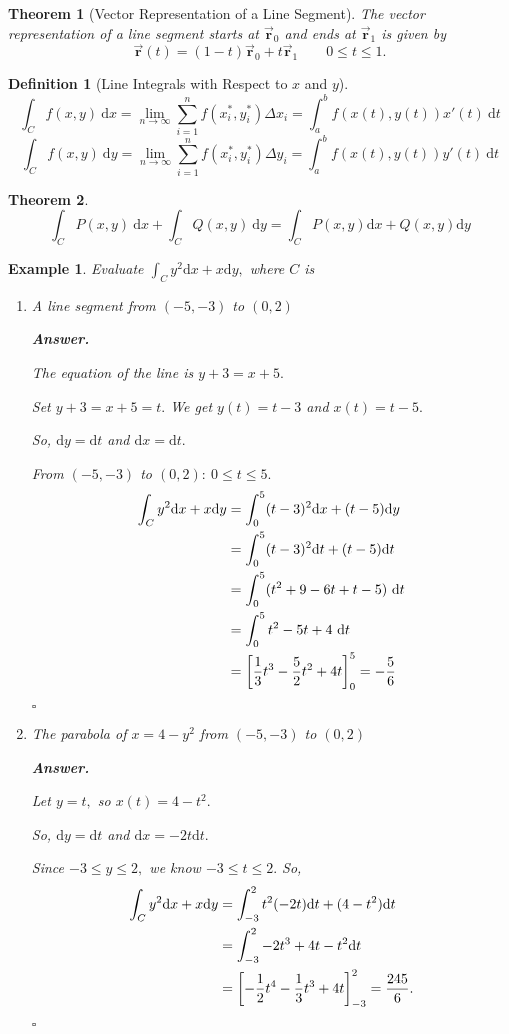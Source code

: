 \documentclass[12pt,a4paper]{article}
\newtheorem{thm}{Theorem}[subsection]
\newtheorem{df}{Definition}[subsection]
\newtheorem{eg}{Example}[subsection]
\newenvironment*{ans}{\par\indent\textbf{\textit{Answer. }}\par}{\par\hfill{$\square$}\par}
\def\dsst{\displaystyle}
\def\d{{\mathrm{d}}}
\def\dx{\d x}
\def\dy{\d y}
\def\dt{\d t}
\def\intC{\dsst\int_C}
\def\vecr{\vec{\boldsymbol{\textbf{r}}}}
\begin{document}
\begin{thm}[Vector Representation of a Line Segment]
	The vector representation of a line segment starts at $\vecr_0$ and ends at $\vecr_1$ is given by \[\vecr(t)=(1-t)\vecr_0+t\vecr_1\qquad0\leq t\leq1.\]	
\end{thm}
\begin{df}[Line Integrals with Respect to $x$ and $y$]
	\[\intC f(x,y)\ \dx=\lim_{n\to\infty}\sum_{i=1}^nf(x_i^*, y_i^*)\Delta x_i=\int_a^bf(x(t), y(t))x'(t)\ \dt\]
	\[\intC f(x,y)\ \dy=\lim_{n\to\infty}\sum_{i=1}^nf(x_i^*, y_i^*)\Delta y_i=\int_a^bf(x(t), y(t))y'(t)\ \dt\]	
\end{df}
\begin{thm}
	\[\intC P(x,y)\ \dx+\intC Q(x,y)\ \dy=\intC P(x,y)\dx+Q(x,y)\dy\]	
\end{thm}
\begin{eg}
	Evaluate $\intC y^2\dx+x\dy,$ where $C$ is 
	\begin{enumerate}
		\item A line segment from $(-5,-3)$ to $(0,2)$
		\begin{ans}
			The equation of the line is $y+3=x+5.$\par Set $y+3=x+5=t.$ We get $y(t)=t-3$ and $x(t)=t-5.$\par So, $\dy=\dt$ and $\dx=\dt.$\par From $(-5,-3)$ to $(0,2):\ 0\leq t\leq5.$ \[\begin{aligned}\intC y^2\dx+x\dy&=\int_0^5(t-3)^2\dx+(t-5)\dy\\&=\int_0^5(t-3)^2\dt+(t-5)\dt\\&=\int_0^5(t^2+9-6t+t-5)\ \dt\\&=\int_0^5 t^2-5t+4\ \dt\\&=\qty[\dfrac{1}{3}t^3-\dfrac{5}{2}t^2+4t]_0^5=-\dfrac{5}{6}\end{aligned}\]
		\end{ans}
		\item The parabola of $x=4-y^2$ from $(-5,-3)$ to $(0,2)$
		\begin{ans}
			Let $y=t,$ so $x(t)=4-t^2.$\par So, $\dy=\dt$ and $\dx=-2t\dt.$\par Since $-3\leq y\leq2,$ we know $-3\leq t\leq2.$ So, \[\begin{aligned}\intC y^2\dx+x\dy&=\int_{-3}^2t^2(-2t)\dt+(4-t^2)\dt\\&=\int_{-3}^2-2t^3+4t-t^2\dt\\&=\qty[-\dfrac{1}{2}t^4-\dfrac{1}{3}t^3+4t]_{-3}^2=\dfrac{245}{6}.\end{aligned}\]
		\end{ans}
	\end{enumerate}	
\end{eg}
\end{document}
